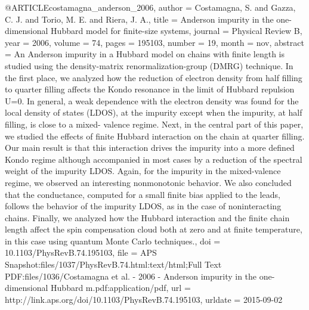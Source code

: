 @ARTICLE{costamagna_anderson_2006,
  author = {Costamagna, S. and Gazza, C. J. and Torio, M. E. and Riera, J. A.},
  title = {Anderson impurity in the one-dimensional {Hubbard} model for finite-size
	systems},
  journal = {Physical Review B},
  year = {2006},
  volume = {74},
  pages = {195103},
  number = {19},
  month = nov,
  abstract = {An Anderson impurity in a Hubbard model on chains with finite length
	is studied using the density-matrix renormalization-group (DMRG)
	technique. In the first place, we analyzed how the reduction of electron
	density from half filling to quarter filling affects the Kondo resonance
	in the limit of Hubbard repulsion U=0. In general, a weak dependence
	with the electron density was found for the local density of states
	(LDOS), at the impurity except when the impurity, at half filling,
	is close to a mixed- valence regime. Next, in the central part of
	this paper, we studied the effects of finite Hubbard interaction
	on the chain at quarter filling. Our main result is that this interaction
	drives the impurity into a more defined Kondo regime although accompanied
	in most cases by a reduction of the spectral weight of the impurity
	LDOS. Again, for the impurity in the mixed-valence regime, we observed
	an interesting nonmonotonic behavior. We also concluded that the
	conductance, computed for a small finite bias applied to the leads,
	follows the behavior of the impurity LDOS, as in the case of noninteracting
	chains. Finally, we analyzed how the Hubbard interaction and the
	finite chain length affect the spin compensation cloud both at zero
	and at finite temperature, in this case using quantum Monte Carlo
	techniques.},
  doi = {10.1103/PhysRevB.74.195103},
  file = {APS Snapshot:files/1037/PhysRevB.74.html:text/html;Full Text PDF:files/1036/Costamagna et     al. - 2006 - Anderson impurity in the one-dimensional Hubbard m.pdf:application/pdf},
  url = {http://link.aps.org/doi/10.1103/PhysRevB.74.195103},
  urldate = {2015-09-02}
}

